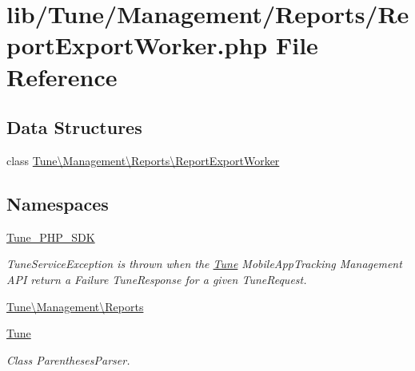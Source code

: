 \hypertarget{ReportExportWorker_8php}{\section{lib/\-Tune/\-Management/\-Reports/\-Report\-Export\-Worker.php File Reference}
\label{ReportExportWorker_8php}
}
\subsection*{Data Structures}
\begin{DoxyCompactItemize}
\item 
class \hyperlink{classTune_1_1Management_1_1Reports_1_1ReportExportWorker}{Tune\textbackslash{}\-Management\textbackslash{}\-Reports\textbackslash{}\-Report\-Export\-Worker}
\end{DoxyCompactItemize}
\subsection*{Namespaces}
\begin{DoxyCompactItemize}
\item 
\hyperlink{namespaceTune__PHP__SDK}{Tune\-\_\-\-P\-H\-P\-\_\-\-S\-D\-K}
\begin{DoxyCompactList}\small\item\em Tune\-Service\-Exception is thrown when the \hyperlink{namespaceTune}{Tune} Mobile\-App\-Tracking Management A\-P\-I return a Failure Tune\-Response for a given Tune\-Request. \end{DoxyCompactList}\item 
\hyperlink{namespaceTune_1_1Management_1_1Reports}{Tune\textbackslash{}\-Management\textbackslash{}\-Reports}
\item 
\hyperlink{namespaceTune}{Tune}
\begin{DoxyCompactList}\small\item\em Class Parentheses\-Parser. \end{DoxyCompactList}\end{DoxyCompactItemize}
